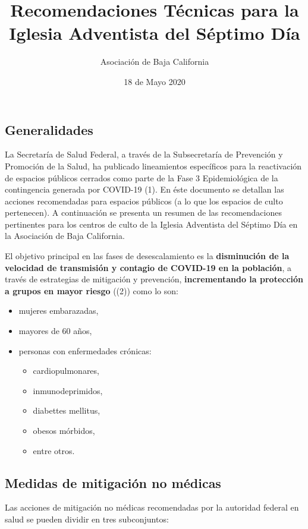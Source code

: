 \documentclass[]{article}
\title{Recomendaciones Técnicas para la Iglesia Adventista del Séptimo Día}
\subtitle{Asociación de Baja California}
\author{}
\date{\vspace{-2.5em}18 de Mayo 2020}
\providecommand{\tightlist}{%
  \setlength{\itemsep}{0pt}\setlength{\parskip}{0pt}}
\begin{document}
\maketitle

\subsection{Generalidades}\label{generalidades}

La Secretaría de Salud Federal, a través de la Subsecretaría de
Prevención y Promoción de la Salud, ha publicado lineamientos
específicos para la reactivación de espacios públicos cerrados como
parte de la Fase 3 Epidemiológica de la contingencia generada por
COVID-19 (1). En éste documento se detallan las acciones recomendadas
para espacios públicos (a lo que los espacios de culto pertenecen). A
continuación se presenta un resumen de las recomendaciones pertinentes
para los centros de culto de la Iglesia Adventista del Séptimo Día en la
Asociación de Baja California.

El objetivo principal en las fases de desescalamiento es la
\textbf{disminución de la velocidad de transmisión y contagio de
COVID-19 en la población}, a través de estrategias de mitigación y
prevención, \textbf{incrementando la protección a grupos en mayor
riesgo} ((2)) como lo son:

\begin{itemize}
\tightlist
\item
  mujeres embarazadas,
\item
  mayores de 60 años,
\item
  personas con enfermedades crónicas:

  \begin{itemize}
  \tightlist
  \item
    cardiopulmonares,
  \item
    inmunodeprimidos,
  \item
    diabettes mellitus,
  \item
    obesos mórbidos,
  \item
    entre otros.
  \end{itemize}
\end{itemize}

\subsection{Medidas de mitigación no
médicas}\label{medidas-de-mitigaciuxf3n-no-muxe9dicas}

Las acciones de mitigación no médicas recomendadas por la autoridad
federal en salud se pueden dividir en tres subconjuntos:
\end{document}
